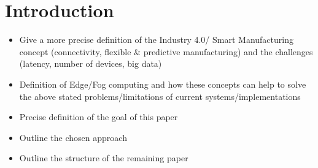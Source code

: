 \section{Introduction}\label{sec:introduction}

\begin{itemize}
\item Give a more precise definition of the Industry 4.0/ Smart Manufacturing concept (connectivity, flexible \& predictive manufacturing) and the challenges (latency, number of devices, big data)
\item Definition of Edge/Fog computing and how these concepts can help to solve the above stated problems/limitations of current systems/implementations
\item Precise definition of the goal of this paper
\item Outline the chosen approach
\item Outline the structure of the remaining paper
\end{itemize}